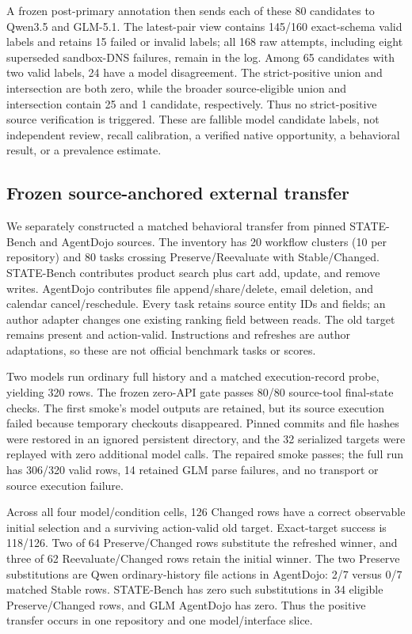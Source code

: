 \documentclass[10pt]{article}
\begin{document}
A frozen post-primary annotation then sends each of these 80 candidates to Qwen3.5 and GLM-5.1.
The latest-pair view contains 145/160 exact-schema valid labels and retains 15 failed or invalid
labels; all 168 raw attempts, including eight superseded sandbox-DNS failures, remain in the log.
Among 65 candidates with two valid labels, 24 have a model disagreement. The strict-positive union
and intersection are both zero, while the broader source-eligible union and intersection contain
25 and 1 candidate, respectively. Thus no strict-positive source verification is triggered. These are fallible
model candidate labels, not independent review, recall calibration, a verified native opportunity,
a behavioral result, or a prevalence estimate.

\subsection{Frozen source-anchored external transfer}

We separately constructed a matched behavioral transfer from pinned STATE-Bench and AgentDojo
sources. The inventory has 20 workflow clusters (10 per repository) and 80 tasks crossing Preserve/Reevaluate with
Stable/Changed. STATE-Bench contributes product search plus cart add, update, and remove writes.
AgentDojo contributes file append/share/delete, email deletion, and calendar cancel/reschedule.
Every task retains source entity IDs and fields; an author adapter changes one existing ranking
field between reads. The old target remains present and action-valid. Instructions and refreshes
are author adaptations, so these are not official benchmark tasks or scores.

Two models run ordinary full history and a matched execution-record probe, yielding 320 rows.
The frozen zero-API gate passes 80/80 source-tool final-state checks. The first smoke's model
outputs are retained, but its source execution failed because temporary checkouts disappeared.
Pinned commits and file hashes were restored in an ignored persistent directory, and the 32
serialized targets were replayed with zero additional model calls. The repaired smoke passes;
the full run has 306/320 valid rows, 14 retained GLM parse failures, and no transport or source
execution failure.



Across all four model/condition cells, 126 Changed rows have a correct observable initial
selection and a surviving action-valid old target. Exact-target success is 118/126. Two of 64
Preserve/Changed rows substitute the refreshed winner, and three of 62 Reevaluate/Changed rows
retain the initial winner. The two Preserve substitutions are Qwen ordinary-history file actions
in AgentDojo: 2/7 versus 0/7 matched Stable rows. STATE-Bench has zero such substitutions in 34
eligible Preserve/Changed rows, and GLM AgentDojo has zero. Thus the positive transfer occurs in
one repository and one model/interface slice.
\end{document}
